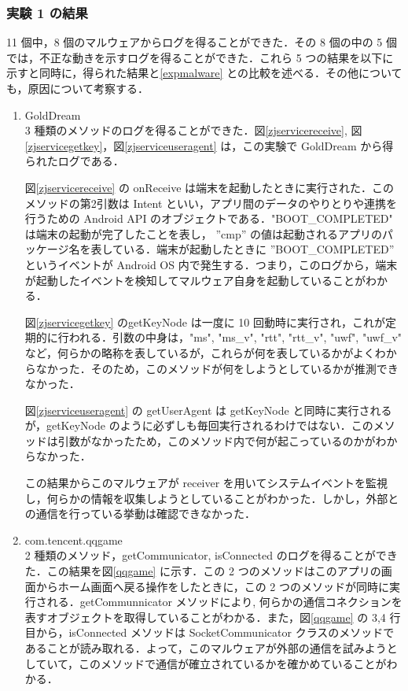 \subsubsection{実験 1 の結果}
11 個中，8 個のマルウェアからログを得ることができた．その 8 個の中の 5 個では，不正な動きを示すログを得ることができた．これら 5 つの結果を以下に示すと同時に，得られた結果と\ref{expmalware} との比較を述べる．その他についても，原因について考察する．
\begin{enumerate}
\item GoldDream \mbox{}\\
	3 種類のメソッドのログを得ることができた．図\ref{zjservicereceive}, 図\ref{zjservicegetkey}，図\ref{zjserviceuseragent} は，この実験で GoldDream から得られたログである．
	
	図\ref{zjservicereceive} の onReceive は端末を起動したときに実行された．このメソッドの第2引数は Intent といい，アプリ間のデータのやりとりや連携を行うための Android API のオブジェクトである．"BOOT\_COMPLETED" は端末の起動が完了したことを表し， ”cmp” の値は起動されるアプリのパッケージ名を表している．端末が起動したときに ”BOOT\_COMPLETED” というイベントが Android OS 内で発生する．つまり，このログから，端末が起動したイベントを検知してマルウェア自身を起動していることがわかる．
	
	図\ref{zjservicegetkey} のgetKeyNode は一度に 10 回動時に実行され，これが定期的に行われる．引数の中身は，"ms", "ms\_v", "rtt", "rtt\_v", "uwf", "uwf\_v" など，何らかの略称を表しているが，これらが何を表しているかがよくわからなかった．そのため，このメソッドが何をしようとしているかが推測できなかった．
	
	図\ref{zjserviceuseragent} の getUserAgent は getKeyNode と同時に実行されるが，getKeyNode のように必ずしも毎回実行されるわけではない．このメソッドは引数がなかったため，このメソッド内で何が起こっているのかがわからなかった．
	
	この結果からこのマルウェアが receiver を用いてシステムイベントを監視し，何らかの情報を収集しようとしていることがわかった．しかし，外部との通信を行っている挙動は確認できなかった．
	
\item com.tencent.qqgame \mbox{}\\
	2 種類のメソッド，getCommunicator, isConnected のログを得ることができた．この結果を図\ref{qqgame} に示す．この 2 つのメソッドはこのアプリの画面からホーム画面へ戻る操作をしたときに，この 2 つのメソッドが同時に実行される．getCommunnicator メソッドにより, 何らかの通信コネクションを表すオブジェクトを取得していることがわかる．また，図\ref{qqgame} の 3,4 行目から，isConnected メソッドは SocketCommunicator クラスのメソッドであることが読み取れる．よって，このマルウェアが外部の通信を試みようとしていて，このメソッドで通信が確立されているかを確かめていることがわかる．
	

\end{enumerate}
